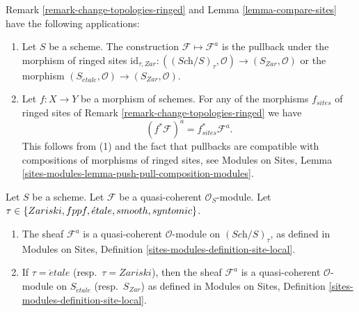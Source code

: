 \begin{remark}
\label{remark-change-topologies-ringed-sites}
Remark \ref{remark-change-topologies-ringed}
and
Lemma \ref{lemma-compare-sites}
have the following applications:
\begin{enumerate}
\item Let $S$ be a scheme.
The construction $\mathcal{F} \mapsto \mathcal{F}^a$ is
the pullback under the morphism of ringed sites
$\text{id}_{\tau, Zar} : ((\textit{Sch}/S)_\tau, \mathcal{O})
\to (S_{Zar}, \mathcal{O})$
or the morphism
$(S_{\acute{e}tale}, \mathcal{O}) \to (S_{Zar}, \mathcal{O})$.
\item Let $f : X \to Y$ be a morphism of schemes.
For any of the morphisms $f_{sites}$ of ringed sites of
Remark \ref{remark-change-topologies-ringed}
we have
$$
(f^*\mathcal{F})^a = f_{sites}^*\mathcal{F}^a.
$$
This follows from (1) and the fact that pullbacks are compatible with
compositions of morphisms of ringed sites, see
Modules on Sites,
Lemma \ref{sites-modules-lemma-push-pull-composition-modules}.
\end{enumerate}
\end{remark}

\begin{lemma}
\label{lemma-quasi-coherent-gives-quasi-coherent}
Let $S$ be a scheme.
Let $\mathcal{F}$ be a quasi-coherent $\mathcal{O}_S$-module.
Let $\tau \in \{Zariski,\linebreak[0] fppf,\linebreak[0]
\acute{e}tale,\linebreak[0] smooth,\linebreak[0] syntomic\}$.
\begin{enumerate}
\item The sheaf $\mathcal{F}^a$ is a quasi-coherent
$\mathcal{O}$-module on $(\textit{Sch}/S)_\tau$, as defined in
Modules on Sites, Definition \ref{sites-modules-definition-site-local}.
\item If $\tau = \acute{e}tale$ (resp.\ $\tau = Zariski$), then the sheaf
$\mathcal{F}^a$ is a quasi-coherent $\mathcal{O}$-module on
$S_{\acute{e}tale}$ (resp.\ $S_{Zar}$) as defined in
Modules on Sites, Definition \ref{sites-modules-definition-site-local}.
\end{enumerate}
\end{lemma}

